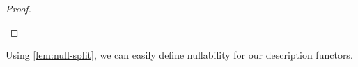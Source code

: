 \begin{proof}
\begin{code}%
%
\>[4]\AgdaSpace{}%
\AgdaSymbol{\{}\AgdaSymbol{\}}\AgdaSpace{}%
\AgdaSymbol{=}\AgdaSpace{}%
\AgdaSpace{}%
\AgdaSymbol{(}\AgdaSpace{}%
\AgdaSpace{}%
\AgdaSpace{}%
\AgdaSymbol{)}\AgdaSpace{}%
\AgdaSymbol{(}\AgdaSpace{}%
\AgdaSpace{}%
\AgdaSpace{}%
\AgdaSymbol{\{}\AgdaSpace{}%
\AgdaSymbol{=}\AgdaSpace{}%
\AgdaSymbol{\}}\AgdaSpace{}%
\AgdaSpace{}%
\AgdaSpace{}%
\AgdaSymbol{)}\<%
\end{code}
\end{proof}

Using \cref{lem:null-split}, we can easily define nullability for our description functors.

\begin{code}%
%
\>[4]\AgdaSpace{}%
\AgdaSymbol{=}\AgdaSpace{}%
\AgdaSpace{}%
\AgdaSpace{}%
\AgdaSpace{}%
\AgdaSpace{}%
\AgdaSymbol{(}\AgdaSpace{}%
\AgdaSpace{}%
\AgdaSymbol{())}\<%
\end{code}

